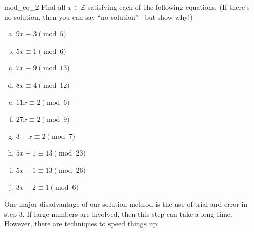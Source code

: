\begin{exercise}{mod_eq_2}
Find all $x \in {\mathbb Z}$ satisfying each of the following equations. (If there's no solution, then you can say ``no solution''-- but show why!)

\begin{multicols}{2}
\begin{enumerate}[(a)]
\item
$9x \equiv 3 \pmod{ 5}$
\item
$5x \equiv 1 \pmod{ 6}$
\item
$7x \equiv 9 \pmod{ 13}$
\item
$8x \equiv 4 \pmod{ 12}$
\item
$11x \equiv 2 \pmod{ 6}$
\item
$27x \equiv 2 \pmod{ 9}$
\item
$3 + x \equiv 2 \pmod{ 7}$
\item
$5x + 1 \equiv 13 \pmod{ 23}$
\item
$5x + 1 \equiv 13 \pmod{ 26}$
\item
$3x + 2 \equiv 1 \pmod{ 6}$  
\end{enumerate}
\end{multicols}
\end{exercise}


One major disadvantage of our solution method is the use of trial and error in step $3$. If large numbers are involved, then this step can take a long time. However, there are techniques to speed things up:

